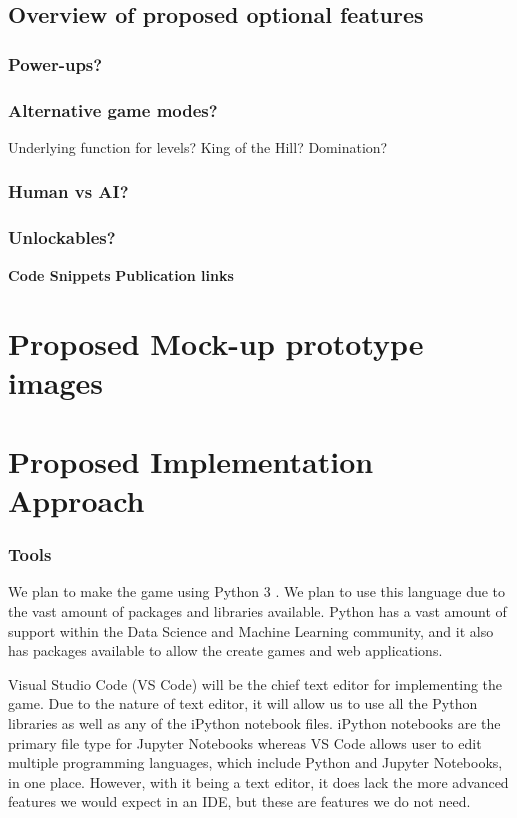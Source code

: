 \documentclass[a4paper,10pt]{article}
\begin{document}
\subsection{Overview of proposed optional features}
\subsubsection{Power-ups?}
\subsubsection{Alternative game modes?}
Underlying function for levels?
King of the Hill?
Domination?
\subsubsection{Human vs AI?}
\subsubsection{Unlockables?}
\textbf{Code Snippets}
\textbf{Publication links}

\section{Proposed Mock-up prototype images}


\section{Proposed Implementation Approach}
\subsubsection{Tools}
We plan to make the game using Python 3 \cite{reference here}. We plan to use this language due to the vast amount of packages and libraries available. Python has a vast amount of support within the Data Science and Machine Learning community, and it also has packages available to allow the create games and web applications. 

Visual Studio Code (VS Code) will be the chief text editor for implementing the game. Due to the nature of text editor, it will allow us to use all the Python libraries as well as any of the iPython notebook files. iPython notebooks are the primary file type for Jupyter Notebooks whereas VS Code allows user to edit multiple programming languages, which include Python and Jupyter Notebooks, in one place. However, with it being a text editor, it does lack the more advanced features we would expect in an IDE, but these are features we do not need.  
\end{document}

